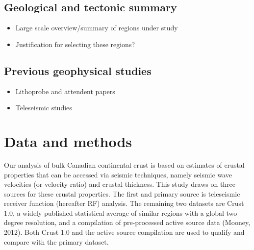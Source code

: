 \documentclass[draft, 12pt]{article}
\begin{document}
\subsection{Geological and tectonic summary}
\begin{itemize}

\item Large scale overview/summary of regions under study
\item Justification for selecting these regions?

\end{itemize}

\subsection{Previous geophysical studies}
 \begin{itemize}

\item Lithoprobe and attendent papers
\item Teleseismic studies

\end{itemize}





\section{Data and methods}
Our analysis of bulk Canadian continental crust is based on estimates of crustal properties that can be accessed via seismic techniques, namely seismic wave velocities (or velocity ratio) and crustal thickness. This study draws on three sources for these crustal properties. The first and primary source is teleseismic receiver function (hereafter RF) analysis. The remaining two datasets are Crust 1.0, a widely published statistical average of similar regions with a global two degree resolution, and a compilation of pre-processed active source data (Mooney, 2012). Both Crust 1.0 and the active source compilation are used to qualify and compare with the primary dataset.
\end{document}
